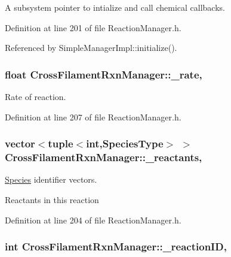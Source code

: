 A subsystem pointer to intialize and call chemical callbacks. 



Definition at line 201 of file Reaction\+Manager.\+h.



Referenced by Simple\+Manager\+Impl\+::initialize().

\hypertarget{classCrossFilamentRxnManager_a653389d857c83927af4e621963af3ab1}{
\subsubsection[{\+\_\+rate}]{\setlength{\rightskip}{0pt plus 5cm}float Cross\+Filament\+Rxn\+Manager\+::\+\_\+rate\hspace{0.3cm}{\ttfamily [protected]}, {\ttfamily [inherited]}}}\label{classCrossFilamentRxnManager_a653389d857c83927af4e621963af3ab1}


Rate of reaction. 



Definition at line 207 of file Reaction\+Manager.\+h.

\hypertarget{classCrossFilamentRxnManager_ad1c41fba7b85d5eedee363b8eeb472d4}{
\subsubsection[{\+\_\+reactants}]{\setlength{\rightskip}{0pt plus 5cm}vector$<$tuple$<$int,{\bf Species\+Type}$>$ $>$ Cross\+Filament\+Rxn\+Manager\+::\+\_\+reactants\hspace{0.3cm}{\ttfamily [protected]}, {\ttfamily [inherited]}}}\label{classCrossFilamentRxnManager_ad1c41fba7b85d5eedee363b8eeb472d4}


\hyperlink{classSpecies}{Species} identifier vectors. 

Reactants in this reaction 

Definition at line 204 of file Reaction\+Manager.\+h.

\hypertarget{classCrossFilamentRxnManager_a97369fa2db6318dd7b60c3772087b4e1}{
\subsubsection[{\+\_\+reaction\+I\+D}]{\setlength{\rightskip}{0pt plus 5cm}int Cross\+Filament\+Rxn\+Manager\+::\+\_\+reaction\+I\+D\hspace{0.3cm}{\ttfamily [protected]}, {\ttfamily [inherited]}}}\label{classCrossFilamentRxnManager_a97369fa2db6318dd7b60c3772087b4e1}



